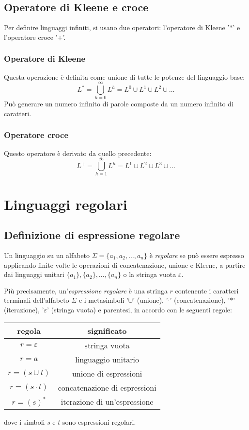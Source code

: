 \documentclass[11pt]{article}
\begin{document}
\subsection{Operatore di Kleene e croce}
Per definire linguaggi infiniti, si usano due operatori: l'operatore di Kleene '$*$' e l'operatore croce '$+$'.
\subsubsection*{Operatore di Kleene}
Questa operazione è definita come unione di tutte le potenze del linguaggio base:
\begin{equation*}
    L^*=\bigcup^{\infty}_{h=0}L^h=L^0\cup L^1\cup L^2 \cup \dots
\end{equation*}
Può generare un numero infinito di parole composte da un numero infinito di caratteri.
\subsubsection*{Operatore croce}
Questo operatore è derivato da quello precedente:
\begin{equation*}
    L^+=\bigcup^{\infty}_{h=1}L^h=L^1\cup L^2\cup L^3 \cup \dots
\end{equation*}
\section{Linguaggi regolari}
\subsection{Definizione di espressione regolare}
Un linguaggio su un alfabeto $\Sigma=\{a_1,a_2,\dots,a_n\}$ è \textit{regolare} se può essere espresso applicando finite 
volte le operazioni di concatenazione, unione e Kleene, a partire dai linguaggi unitari $\{a_1\},\{a_2\},\dots,\{a_n\}$ o 
la stringa vuota $\varepsilon$.

Più precisamente, un'\textit{espressione regolare} è una stringa $r$ contenente i caratteri terminali dell'alfabeto 
$\Sigma$ e i metasimboli '$\cup$' (unione), '$\cdot$' (concatenazione), '$*$' (iterazione), '$\varepsilon$' (stringa vuota)
e parentesi, in accordo con le seguenti regole:
\begin{center}
    \begin{tabular}{ |c|c| }
        \hline
        regola & significato \\
        \hline
        $r=\varepsilon$ & stringa vuota \\
        $r=a$ & linguaggio unitario \\
        $r=(s\cup t)$ & unione di espressioni \\
        $r=(s\cdot t)$ & concatenazione di espressioni \\
        $r=(s)^*$ & iterazione di un'espressione \\
        \hline
    \end{tabular}
\end{center}
dove i simboli $s$ e $t$ sono espressioni regolari.
\end{document}
